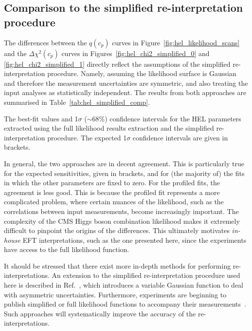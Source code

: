 \subsection{Comparison to the simplified re-interpretation procedure}
The differences between the $q(c_p)$ curves in Figure~\ref{fig:hel_likelihood_scans} and the $\Delta\chi^2(c_p)$ curves in Figures~\ref{fig:hel_chi2_simplified_0} and \ref{fig:hel_chi2_simplified_1} directly reflect the assumptions of the simplified re-interpretation procedure. Namely, assuming the likelihood surface is Gaussian and therefore the measurement uncertainties are symmetric, and also treating the input analyses as statistically independent. The results from both approaches are summarised in Table~\ref{tab:hel_simplified_comp}.

\begin{table}[htb!]
  \centering
  \footnotesize
  \renewcommand{\arraystretch}{1.6}
  \setlength{\tabcolsep}{2pt}
  \caption[Comparison to the HEL parameter constraints from the simplified re-interpretation procedure]
  {
    The best-fit values and 1$\sigma$ ($\sim$68\%) confidence intervals for the HEL parameters extracted using the full likelihood results extraction and the simplified re-interpretation procedure. The expected 1$\sigma$ confidence intervals are given in brackets.
  }
  \label{tab:hel_simplified_comp}
  
\end{table}

In general, the two approaches are in decent agreement. This is particularly true for the expected sensitivities, given in brackets, and for (the majority of) the fits in which the other parameters are fixed to zero. For the profiled fits, the agreement is less good. This is because the profiled fit represents a more complicated problem, where certain nuances of the likelihood, such as the correlations between input measurements, become increasingly important. The complexity of the CMS Higgs boson combination likelihood makes it extremely difficult to pinpoint the origins of the differences. This ultimately motivates \textit{in-house} EFT interpretations, such as the one presented here, since the experiments have access to the full likelihood function.

It should be stressed that there exist more in-depth methods for performing re-interpretations. An extension to the simplified re-interpretation procedure used here is described in Ref.~\cite{Kraml:2019sis}, which introduces a variable Gaussian function to deal with asymmetric uncertainties. Furthermore, experiments are beginning to publish simplified or full likelihood functions to accompany their measurements~\cite{10.21468SciPostPhys.9.2.022}. Such approaches will systematically improve the accuracy of the re-interpretations.

